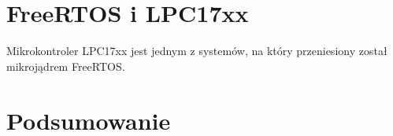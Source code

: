 \section{FreeRTOS i LPC17xx}
\label{sec:rtosLPC}

Mikrokontroler LPC17xx jest jednym z systemów, na który przeniesiony został mikrojądrem FreeRTOS.

\section{Podsumowanie}
\label{sec:rtosPodsumowanie}